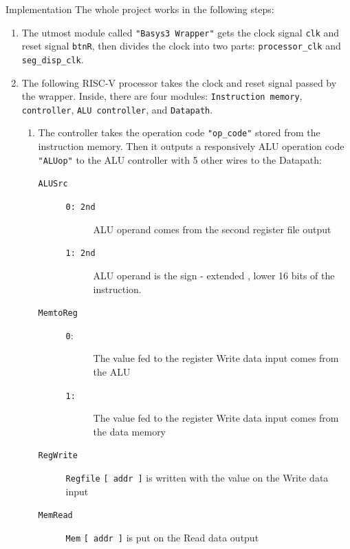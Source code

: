 \documentclass[12pt,fleqn]{book} %
\makeatletter
\numberwithin{dummy}{section}
\theoremstyle{ocrenumbox}
\theoremstyle{blacknumexe}
\theoremstyle{blacknumexa}
\theoremstyle{blacknumessential}
\theoremstyle{blacknumpro}
\theoremstyle{blacknumbox}
\theoremstyle{blacknumbox}
\theoremstyle{ocrenum}
\renewcommand{\section}{\@startsection{section}{1}{\z@}
	{-4ex \@plus -1ex \@minus -.4ex}
	{1ex \@plus.2ex }
	{\normalfont\large\sffamily\bfseries}}
\newlength\esp
\makeatother
\begin{document}
	\section{Implementation}
	The whole project works in the following steps:
	\begin{enumerate}
		\item The utmost module called \texttt{"Basys3 Wrapper"} gets the clock signal \texttt{clk} and reset signal \texttt{btnR}, then divides the clock into two parts: \texttt{processor\_clk} and \texttt{seg\_disp\_clk}. 
		
		\item The following RISC-V processor takes the clock and reset signal passed by the wrapper. Inside, there are four modules: \texttt{Instruction memory}, \texttt{controller}, \texttt{ALU controller}, and \texttt{Datapath}.
		\begin{enumerate}
			\item The controller takes the operation code \texttt{"op\_code"} stored from the instruction memory. Then it outputs a responsively ALU operation code \texttt{"ALUop"} to the ALU controller with 5 other wires to the Datapath:
			\begin{description}
				\item[\texttt{ALUSrc}] \hfill
				\begin{description}
					\item[\texttt{0: 2nd}] ALU operand comes from the second register file output
					\item[\texttt{1: 2nd}] ALU operand is the sign - extended , lower 16 bits of the instruction.
				\end{description}
			
				\item[\texttt{MemtoReg}] \hfill
				\begin{description}
					\item[\texttt{0}:] The value fed to the register Write data input comes from the ALU
					\item[\texttt{1:}] The value fed to the register Write data input comes from the data memory
				\end{description}
			
				\item[\texttt{RegWrite}] \texttt{Regfile} \texttt{[ addr ]} is written with the value on the Write data input
				
				\item[\texttt{MemRead}] \texttt{Mem} \texttt{[ addr ]} is put on the Read data
				 output
				 

\end{description}
\end{enumerate}
\end{enumerate}
\end{document}
